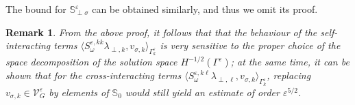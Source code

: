 \documentclass[]{article}
\newtheorem{remark}{Remark}
\numberwithin{equation}{section}
\numberwithin{theorem}{section}
\numberwithin{lemma}{section}
\numberwithin{corollary}{section}
\numberwithin{proposition}{section}
\numberwithin{definition}{section}
\newcommand{\re}{\varepsilon}
\begin{document}
	The bound for $\mathbb{S}_{\perp\sigma}^{\re}$ can be obtained similarly, and thus we omit its proof.  
	\begin{remark}
		\label{remark:choice_of_decomposition}
		From the above proof, it follows that that the behaviour of the self-interacting terms $\langle S^{\re, kk}_{\omega} \lambda_{\perp,k}, v_{\sigma,k} \rangle_{\Gamma^{\re}_k}$  is very sensitive to the proper choice of the space decomposition of the solution space $H^{-1/2}(\Gamma^{\re})$; at the same time, it can be shown that for the cross-interacting terms $\langle S^{\re, k \ell}_{\omega} \lambda_{\perp, \ell}, v_{\sigma,k} \rangle_{\Gamma^{\re}_k}$, replacing $v_{\sigma,k}\in \mathcal{V}^{\re}_G$ by elements of $\mathbb{S}_0$ would  still yield an estimate of order $\re^{5/2}$.
	\end{remark}
	
\end{document}
